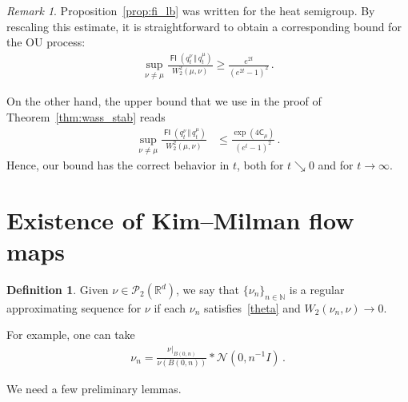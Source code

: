 \documentclass[12pt]{article}
\newcommand{\cN}{\mathcal{N}}
\newcommand{\cP}{\mathcal{P}}
\newcommand{\RR}{\mathbb{R}}
\newcommand{\R}{\RR}
\newcommand{\N}{\mathbb{N}}
\newcommand{\1}{\mathds{1}}
\newcommand{\mmid}{\,\Vert\,}
\DeclareMathOperator*{\FI}{\mathsf{FI}}
\renewcommand{\ge}{\geqslant}
\renewcommand{\le}{\leqslant}
\theoremstyle{plain}
\theoremstyle{definition}
\newtheorem{definition}[theorem]{Definition}
\theoremstyle{remark}
\newtheorem{remark}[theorem]{Remark}
\begin{document}
\begin{remark}
Proposition~\ref{prop:fi_lb} was written for the heat semigroup. By rescaling this estimate, it is straightforward to obtain a corresponding bound for the OU process:
\begin{align*}
    \sup_{\nu\ne \mu} \frac{\FI(q_t^\nu\mmid q_t^\mu)}{W_2^2(\mu,\nu)}
    \ge \frac{{e^{2t}}}{(e^{2t}-1)^2}\,.
\end{align*}    
\end{remark}
On the other hand, the upper bound that we use in the proof of Theorem~\ref{thm:wass_stab} reads
\begin{align*}
    \sup_{\nu\ne \mu} \frac{\FI(q_t^\nu\mmid q_t^\mu)}{W_2^2(\mu,\nu)}
    &\le \frac{\exp(4\mathsf C_\mu)}{(e^t-1)^2}\,.
\end{align*}
Hence, our bound has the correct behavior in $t$, both for $t\searrow 0$ and for $t\to\infty$.




\newpage
\appendix


\section{Existence of Kim--Milman flow maps}\label{app:existence}


\begin{definition}\label{def:reg_approx}
Given $\nu \in \cP_2(\R^d)$, we say that $\{\nu_n\}_{n\in\N}$ is a regular approximating sequence for $\nu$ if each $\nu_n$ satisfies~\eqref{theta} and $W_2(\nu_n,\nu) \to 0$.
\end{definition}

For example, one can take
\begin{align*}
    \nu_n = \frac{\nu|_{B(0,n)}}{\nu(B(0,n))} * \cN(0,n^{-1} I)\,.
\end{align*}

{We need a few preliminary lemmas.}
\end{document}

